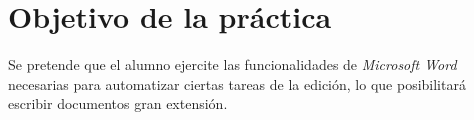 
\usepackage{eurosym}





\renewcommand{\hmwkTitle}{Ejercicios de \textit{Microsoft Word}}
\renewcommand{\hmwkClass}{TICO1}


\usepackage{blindtext}






\primerapagina

\setlength{\parindent}{0em}
\setlength{\parskip}{1em}

\section{Objetivo de la práctica}
Se pretende que el alumno ejercite las funcionalidades de \textit{Microsoft Word} necesarias para automatizar ciertas tareas de la edición, lo que posibilitará escribir documentos gran extensión.



\newcommand{\urlagithub}[1]{\attachfile{./textos/#1}\enlace{https://alvarogonzalezsotillo.github.io/tico1-bach1/apuntes/5/#1}{#1}}

